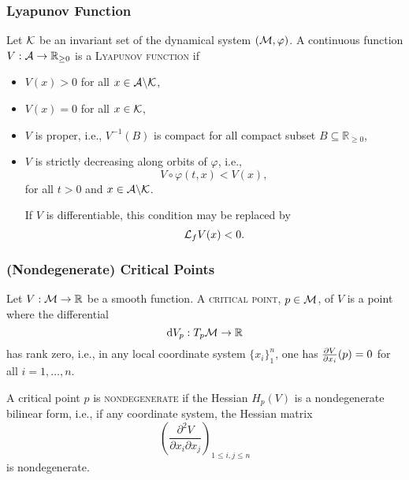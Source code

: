\begin{frame}
    \frametitle{Lyapunov Function}

    \begin{definition}
        Let $\mathcal{K}$ be an invariant set of the dynamical system $(\mathcal{M},
        \varphi)$. A continuous function $V: \mathcal{A} \rightarrow \mathbb{R}_{\geq
        0}$ is a \textsc{Lyapunov function} if

        \begin{itemize}
            \item $V(x) > 0$ for all $x \in \mathcal{A} \backslash \mathcal{K}$,
            \item $V(x) = 0$ for all $x \in \mathcal{K}$,
            \item $V$ is proper, i.e., $V^{-1}(B)$ is compact for all compact
            subset $B \subseteq \mathbb{R}_{\geq 0}$,
            \item $V$ is strictly decreasing along orbits of $\varphi$, i.e.,
            \vspace{-1mm}
            \[ V \circ \varphi(t,x) < V(x), \] \vspace{-1mm} for all $t > 0$ and
            $x \in \mathcal{A} \backslash \mathcal{K}$.

            If $V$ is differentiable, this condition may be replaced by
            \[ \mathcal{L}_fV(x) < 0. \]
        \end{itemize}
    \end{definition}
\end{frame}


\begin{frame}
    \frametitle{(Nondegenerate) Critical Points}

    \begin{definition}
        Let $V: \mathcal{M} \rightarrow \mathbb{R}$ be a smooth function. A
        \textsc{critical point}, $p \in \mathcal{M}$, of $V$ is a point where the
        differential \[ \operatorname{d}\! V_p: T_p\mathcal{M} \rightarrow \mathbb{R} \] has rank
        zero, i.e., in any local coordinate system $\{x_i\}_{1}^n$, one has
        $\frac{\partial V}{\partial x_i}(p) = 0$ for all $i = 1, \ldots, n$.
    \end{definition}

    \begin{definition}
        A critical point $p$ is \textsc{nondegenerate} if the Hessian $H_p(V)$
        is a nondegenerate bilinear form, i.e., if any coordinate system, the
        Hessian matrix \[ \left( \frac{ \partial^2 V }{ \partial x_i \partial
        x_j } \right)_{1 \leq i,j \leq n} \] is nondegenerate.
    \end{definition}
\end{frame}



